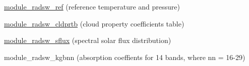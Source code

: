 \begin{DoxyItemize}
\item \hyperlink{namespacemodule__radsw__ref}{module\+\_\+radsw\+\_\+ref} (reference temperature and pressure)
\item \hyperlink{namespacemodule__radsw__cldprtb}{module\+\_\+radsw\+\_\+cldprtb} (cloud property coefficients table)
\item \hyperlink{namespacemodule__radsw__sflux}{module\+\_\+radsw\+\_\+sflux} (spectral solar flux distribution)
\item module\+\_\+radsw\+\_\+kgbnn (absorption coeffients for 14 bands, where nn = 16-\/29) 
\end{DoxyItemize}